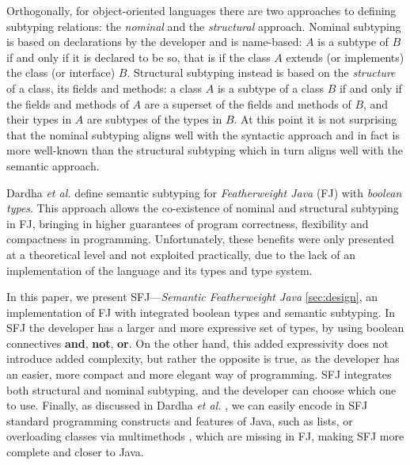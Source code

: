 \documentclass[runningheads]{llncs}
\begin{document}
Orthogonally, for object-oriented languages there are two approaches to defining subtyping relations: the \emph{nominal} and the \emph{structural} approach.
Nominal subtyping is based on {declarations} by the developer and is {name}-based: $A$ is a subtype of $B$ if and only if it is declared to be so, that is if the class $A$ extends (or implements) the class (or interface) $B$.
Structural subtyping instead is based on the \emph{structure} of a class, its fields and methods: a class $A$ is a subtype of a class $B$ if and only if the fields and methods of $A$ are a superset of the fields and methods of $B$, and their types in $A$ are subtypes of the types in $B$.
At this point it is not surprising that the nominal subtyping aligns well with the syntactic approach and in fact is more well-known than the structural subtyping which in turn aligns well with the semantic approach.

Dardha \emph{et al.} \cite{Dardha2013,Dardha2017} define semantic subtyping for \emph{Featherweight Java} (FJ) \cite{featherweight} with \emph{boolean types}.
This approach allows the co-existence of nominal and structural subtyping in FJ, bringing in higher guarantees of program correctness, flexibility and compactness in programming.
Unfortunately, these benefits were only presented at a theoretical level and not exploited practically, due to the lack of an implementation of the language and its types and type system.

In this paper, we present SFJ---\emph{Semantic Featherweight Java} \autoref{sec:design}, an implementation of FJ with integrated boolean types and semantic subtyping.
In SFJ the developer has a larger and more expressive set of types, by using boolean connectives \textbf{and}, \textbf{not}, \textbf{or}. On the other hand, this added expressivity does not introduce added complexity, but rather the opposite is true, as the developer has an easier, more compact and more elegant way of programming.
SFJ integrates both structural and nominal subtyping, and the developer can choose which one to use.
Finally, as discussed in Dardha \emph{et al.} \cite[\S 8.4]{Dardha2017}, we can easily encode in SFJ standard programming constructs and features of Java, such as lists, or overloading classes via multimethods \cite{BC97}, which are missing in FJ, making SFJ more complete and closer to Java.
\end{document}

